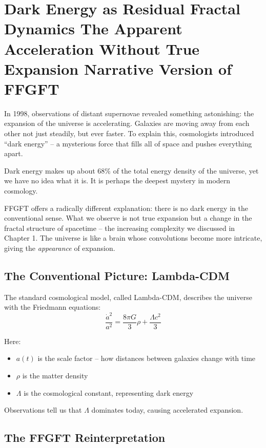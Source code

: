 \chapter{Dark Energy as Residual Fractal Dynamics  The Apparent Acceleration Without True Expansion  Narrative Version of FFGFT}



In 1998, observations of distant supernovae revealed something astonishing: the expansion of the universe is accelerating. Galaxies are moving away from each other not just steadily, but ever faster. To explain this, cosmologists introduced ``dark energy'' -- a mysterious force that fills all of space and pushes everything apart.

Dark energy makes up about 68\% of the total energy density of the universe, yet we have no idea what it is. It is perhaps the deepest mystery in modern cosmology.

FFGFT offers a radically different explanation: there is no dark energy in the conventional sense. What we observe is not true expansion but a change in the fractal structure of spacetime -- the increasing complexity we discussed in Chapter 1. The universe is like a brain whose convolutions become more intricate, giving the \textit{appearance} of expansion.

\section{The Conventional Picture: Lambda-CDM}

The standard cosmological model, called Lambda-CDM, describes the universe with the Friedmann equations:
\begin{equation}
\frac{\dot{a}^2}{a^2} = \frac{8\pi G}{3}\rho + \frac{\Lambda c^2}{3}
\end{equation}

Here:
\begin{itemize}[leftmargin=*]
\item $a(t)$ is the scale factor -- how distances between galaxies change with time
\item $\rho$ is the matter density
\item $\Lambda$ is the cosmological constant, representing dark energy
\end{itemize}

Observations tell us that $\Lambda$ dominates today, causing accelerated expansion.

\section{The FFGFT Reinterpretation}

